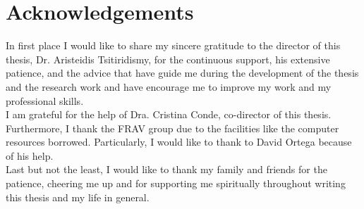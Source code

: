 \section{Acknowledgements} %
In first place I would like to share my sincere gratitude to the director of this thesis, Dr. Aristeidis Tsitiridismy, for the continuous support, his extensive patience, and the advice that have guide me during the development of the thesis and the research work and have encourage me to improve my work and my professional skills.\\

I am grateful for the help of Dra. Cristina Conde, co-director of this thesis. Furthermore, I thank the FRAV group due to the facilities like the computer resources borrowed. Particularly, I would like to thank to David Ortega because of his help.\\

Last but not the least, I would like to thank my family and friends for the patience, cheering me up and for supporting me spiritually throughout writing this thesis and my life in general.\\
